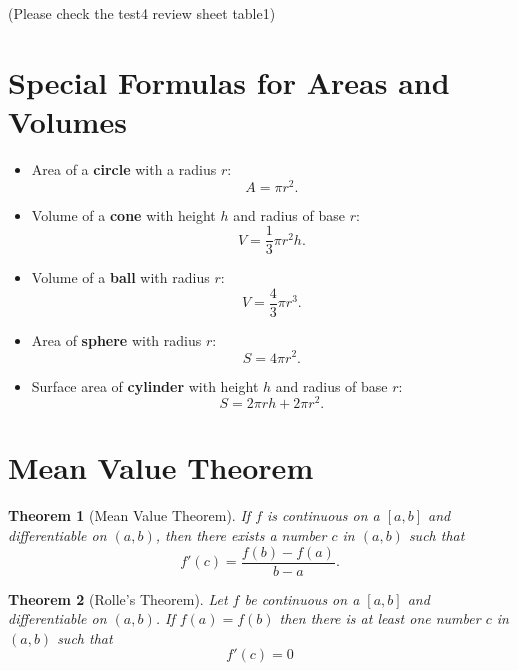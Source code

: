 \documentclass[12pt]{article}
\newtheorem{theorem}{\bf Theorem}[section]
\begin{document}
(Please check the test4 review sheet table1)

\clearpage 
\section{Special Formulas for Areas and Volumes}
\begin{itemize}
\item Area of a {\bf circle} with a radius $r$: $$A=\pi r^2.$$

\item Volume of a {\bf cone} with height $h$ and radius of base $r$: $$V=\frac{1}{3} \pi r^2 h.$$

\item Volume of a {\bf ball} with radius $r$:
$$V=\frac{4}{3} \pi r^3.$$

\item Area of {\bf sphere} with radius $r$:
$$S= 4 \pi r^2.$$

\item Surface area of {\bf cylinder} with height $h$ and radius of base $r$:
$$ S=2\pi r h +2 \pi r^2.$$ 


\end{itemize}

\section{Mean Value Theorem}
\begin{theorem}[Mean Value Theorem]
If $f$ is continuous on a $[a,b]$ and differentiable on $(a,b)$,
then there exists a number $c$ in $(a,b)$ such that
$$ f'(c)=\dfrac{f(b)-f(a)}{b-a}.$$
\end{theorem}

\begin{theorem}[Rolle's Theorem]
Let $f$ be continuous on a $[a,b]$ and differentiable on $(a,b)$.
If $f(a)=f(b)$ then there is at least one number $c$ in $(a,b)$ such that
$$f'(c)=0$$
\end{theorem}
\end{document}
